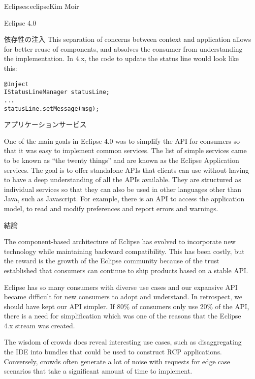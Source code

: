 \begin{aosachapter}{Eclipse}{s:eclipse}{Kim Moir}
\begin{aosasect1}{Eclipse 4.0}
\begin{aosasect2}{依存性の注入}
This separation of concerns between context and application allows for
better reuse of components, and absolves the consumer from
understanding the implementation.  In 4.x, the code to update the
status line would look like this:

\begin{verbatim}
@Inject
IStatusLineManager statusLine;
...
statusLine.setMessage(msg);
\end{verbatim}

\end{aosasect2}

\begin{aosasect2}{アプリケーションサービス}

One of the main goals in Eclipse 4.0 was to simplify the API for
consumers so that it was easy to implement common services. The list
of simple services came to be known as ``the twenty things'' and are
known as the Eclipse Application services. The goal is to offer
standalone APIs that clients can use without having to have a deep
understanding of all the APIs available. They are structured as
individual services so that they can also be used in other languages
other than Java, such as Javascript.  For example, there is an API to
access the application model, to read and modify preferences and
report errors and warnings.

\end{aosasect2}

\end{aosasect1}

\begin{aosasect1}{結論}

The component-based architecture of Eclipse has evolved to incorporate
new technology while maintaining backward compatibility.  This has
been costly, but the reward is the growth of the Eclipse community
because of the trust established that consumers can continue to ship
products based on a stable API.

Eclipse has so many consumers with diverse use cases and our expansive
API became difficult for new consumers to adopt and understand. In
retrospect, we should have kept our API simpler. If 80\% of consumers
only use 20\% of the API, there is a need for simplification which was
one of the reasons that the Eclipse 4.x stream was created.

The wisdom of crowds does reveal interesting use cases, such as
disaggregating the IDE into bundles that could be used to construct
RCP applications.  Conversely, crowds often generate a lot of noise
with requests for edge case scenarios that take a significant amount
of time to implement.


\end{aosasect1}
\end{aosachapter}
